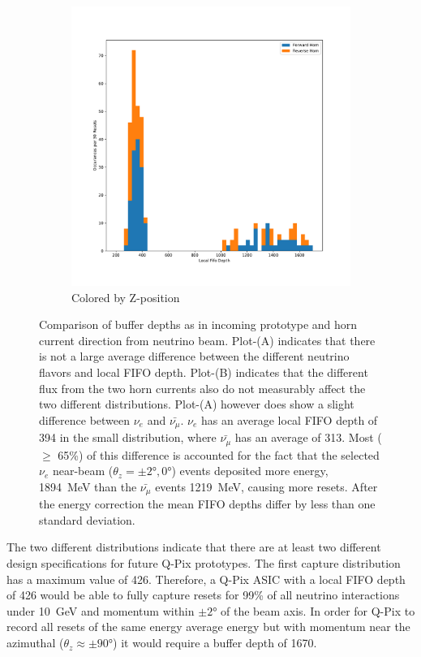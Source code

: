 \begin{figure}
\begin{subfigure}{.5\textwidth}
  \includegraphics[width=\textwidth]{images/df_horn_cut.pdf}
  \caption{Colored by Z-position}
\end{subfigure}
\caption{Comparison of buffer depths as in incoming prototype and horn current direction from neutrino beam.
Plot-(A) indicates that there is not a large average difference between the different neutrino flavors and local FIFO depth.
Plot-(B) indicates that the different flux from the two horn currents also do not measurably affect the two different distributions.
Plot-(A) however does show a slight difference between $\nu_{e}$ and $\bar{\nu_{\mu}}$.
$\nu_{e}$ has an average local FIFO depth of 394 in the small distribution, where $\bar{\nu_{\mu}}$ has an average of 313.
Most ($\geq $ 65\%) of this difference is accounted for the fact that the selected $\nu_{e}$ near-beam ($\theta_{z} = \pm 2\unit{\degree}, 0\unit{\degree}$) events deposited more energy, 1894~\unit{MeV} than the $\bar{\nu_{\mu}}$ events 1219~\unit{MeV}, causing more resets.
After the energy correction the mean FIFO depths differ by less than one standard deviation.
}
\label{fig:compare_integral_pdg}
\end{figure}

The two different distributions indicate that there are at least two different design specifications for future Q-Pix prototypes.
The first capture distribution has a maximum value of 426.
Therefore, a Q-Pix ASIC with a local FIFO depth of 426 would be able to fully capture resets for 99\% of all neutrino interactions under 10~\unit{GeV} and momentum within $\pm 2\unit{\degree}$ of the beam axis.
In order for Q-Pix to record all resets of the same energy average energy but with momentum near the azimuthal ($\theta_{z} \approx \pm 90$\unit{\degree}) it would require a buffer depth of 1670.

